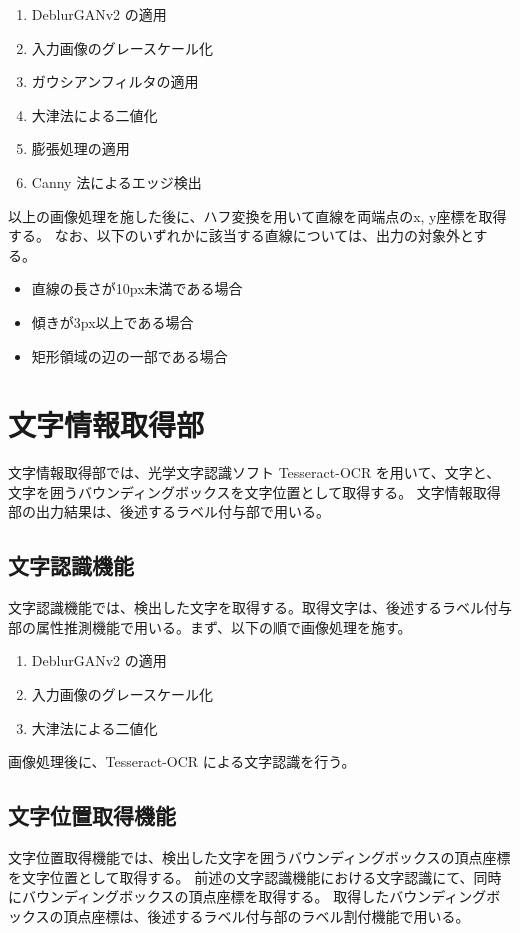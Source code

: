 \begin{enumerate}[label=(\arabic*)]
    \item DeblurGANv2 の適用
    \item 入力画像のグレースケール化
    \item ガウシアンフィルタの適用
    \item 大津法による二値化
    \item 膨張処理の適用
    \item Canny 法によるエッジ検出
\end{enumerate}

以上の画像処理を施した後に、ハフ変換を用いて直線を両端点のx, y座標を取得する。
なお、以下のいずれかに該当する直線については、出力の対象外とする。

\begin{itemize}
    \item 直線の長さが10px未満である場合
    \item 傾きが3px以上である場合
    \item 矩形領域の辺の一部である場合
\end{itemize}



\section{文字情報取得部}\label{sec:OCR_part}
文字情報取得部では、光学文字認識ソフト Tesseract-OCR を用いて、文字と、文字を囲うバウンディングボックスを文字位置として取得する。
文字情報取得部の出力結果は、後述するラベル付与部で用いる。

\subsection{文字認識機能}\label{subsec:char_recognition}
文字認識機能では、検出した文字を取得する。取得文字は、後述するラベル付与部の属性推測機能で用いる。まず、以下の順で画像処理を施す。

\begin{enumerate}[label=(\arabic*)]
    \item DeblurGANv2 の適用
    \item 入力画像のグレースケール化
    \item 大津法による二値化
\end{enumerate}

画像処理後に、Tesseract-OCR による文字認識を行う。

\subsection{文字位置取得機能}\label{subsec:char_position_obtainment}
文字位置取得機能では、検出した文字を囲うバウンディングボックスの頂点座標を文字位置として取得する。
前述の文字認識機能における文字認識にて、同時にバウンディングボックスの頂点座標を取得する。
取得したバウンディングボックスの頂点座標は、後述するラベル付与部のラベル割付機能で用いる。


